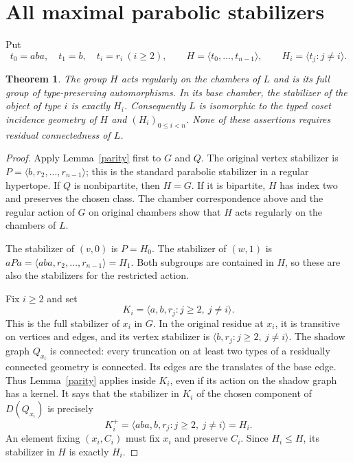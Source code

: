 \documentclass[11pt,a4paper]{article}
\newtheorem{theorem}{Theorem}
\newcommand{\gen}[1]{\langle #1\rangle}
\begin{document}
\section{All maximal parabolic stabilizers}
Put
\[
 t_0=aba,\quad t_1=b,\quad t_i=r_i\ (i\ge2),
 \qquad H=\gen{t_0,\ldots,t_{n-1}},\qquad
 H_i=\gen{t_j:j\ne i}.
\]
\begin{theorem}\label{cosets}
The group $H$ acts regularly on the chambers of $L$ and is its
full group of type-preserving automorphisms. In its base chamber,
the stabilizer of the object of type $i$ is exactly $H_i$.
Consequently $L$ is isomorphic to the typed coset incidence
geometry of $H$ and $(H_i)_{0\le i<n}$.
None of these assertions requires residual connectedness of $L$.
\end{theorem}
\begin{proof}
Apply Lemma~\ref{parity} first to $G$ and $Q$. The original
vertex stabilizer is $P=\gen{b,r_2,\ldots,r_{n-1}}$; this is
the standard parabolic stabilizer in a regular hypertope.
If $Q$ is nonbipartite, then $H=G$. If it is bipartite, $H$
has index two and preserves the chosen class. The chamber
correspondence above and the regular action of $G$ on original
chambers show that $H$ acts regularly on the chambers of $L$.

The stabilizer of $(v,0)$ is $P=H_0$. The stabilizer of $(w,1)$
is $aPa=\gen{aba,r_2,\ldots,r_{n-1}}=H_1$.
Both subgroups are contained in $H$, so these are also the
stabilizers for the restricted action.

Fix $i\ge2$ and set
\[
 K_i=\gen{a,b,r_j: j\ge2,\ j\ne i}.
\]
This is the full stabilizer of $x_i$ in $G$. In the original
residue at $x_i$, it is transitive on vertices and edges, and
its vertex stabilizer is $\gen{b,r_j:j\ge2,\ j\ne i}$.
The shadow graph $Q_{x_i}$ is connected: every truncation on
at least two types of a residually connected geometry is
connected. Its edges are the translates of the base edge.
Thus Lemma~\ref{parity} applies inside $K_i$, even if its action
on the shadow graph has a kernel. It says that the stabilizer
in $K_i$ of the chosen component of $D(Q_{x_i})$ is precisely
\[
 K_i^+=\gen{aba,b,r_j:j\ge2,\ j\ne i}=H_i.
\]
An element fixing $(x_i,C_i)$ must fix $x_i$ and preserve $C_i$.
Since $H_i\le H$, its stabilizer in $H$ is exactly $H_i$.


\end{proof}
\end{document}
